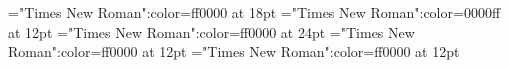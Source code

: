 \documentclass[a4paper]{article}
\begin{document}
 
\pagestyle{plain} 
\font\spanheaderdiv="Times New Roman":color=ff0000 at 18pt
\font\spandiv="Times New Roman":color=0000ff at 12pt
\font\divheaderdiv="Times New Roman":color=ff0000 at 24pt
\font\divdiv="Times New Roman":color=ff0000 at 12pt
\font\div="Times New Roman":color=ff0000 at 12pt

\pagestyle{fancy} 



\end{document}
